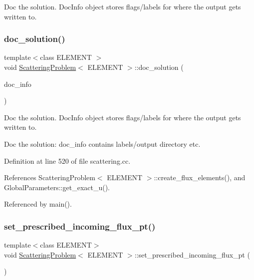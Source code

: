 Doc the solution. Doc\+Info object stores flags/labels for where the output gets written to. 

\mbox{\label{classScatteringProblem_af83ab14c4f4750ea17c21466f6c6364f}} 
\subsubsection{\texorpdfstring{doc\+\_\+solution()}{doc\_solution()}\hspace{0.1cm}{\footnotesize\ttfamily [2/2]}}
{\footnotesize\ttfamily template$<$class E\+L\+E\+M\+E\+NT $>$ \\
void \hyperlink{classScatteringProblem}{Scattering\+Problem}$<$ E\+L\+E\+M\+E\+NT $>$\+::doc\+\_\+solution (\begin{DoxyParamCaption}\item[{Doc\+Info \&}]{doc\+\_\+info }\end{DoxyParamCaption})}



Doc the solution. Doc\+Info object stores flags/labels for where the output gets written to. 

Doc the solution\+: doc\+\_\+info contains labels/output directory etc. 

Definition at line 520 of file scattering.\+cc.



References Scattering\+Problem$<$ E\+L\+E\+M\+E\+N\+T $>$\+::create\+\_\+flux\+\_\+elements(), and Global\+Parameters\+::get\+\_\+exact\+\_\+u().



Referenced by main().

\mbox{\label{classScatteringProblem_ae75307dde909513a0f11057c96cdd622}} 
\subsubsection{\texorpdfstring{set\+\_\+prescribed\+\_\+incoming\+\_\+flux\+\_\+pt()}{set\_prescribed\_incoming\_flux\_pt()}\hspace{0.1cm}{\footnotesize\ttfamily [1/2]}}
{\footnotesize\ttfamily template$<$class E\+L\+E\+M\+E\+NT$>$ \\
void \hyperlink{classScatteringProblem}{Scattering\+Problem}$<$ E\+L\+E\+M\+E\+NT $>$\+::set\+\_\+prescribed\+\_\+incoming\+\_\+flux\+\_\+pt (\begin{DoxyParamCaption}{ }\end{DoxyParamCaption})}



